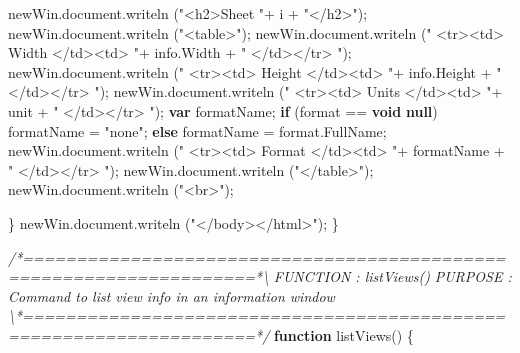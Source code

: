 \documentclass[]{article}
\newenvironment{Shaded}{}{}
\newcommand{\KeywordTok}[1]{\textcolor[rgb]{0.00,0.44,0.13}{\textbf{{#1}}}}
\newcommand{\StringTok}[1]{\textcolor[rgb]{0.25,0.44,0.63}{{#1}}}
\newcommand{\CommentTok}[1]{\textcolor[rgb]{0.38,0.63,0.69}{\textit{{#1}}}}
\newcommand{\OtherTok}[1]{\textcolor[rgb]{0.00,0.44,0.13}{{#1}}}
\newcommand{\FunctionTok}[1]{\textcolor[rgb]{0.02,0.16,0.49}{{#1}}}
\newcommand{\NormalTok}[1]{{#1}}
\begin{document}
\begin{Shaded}
\begin{Highlighting}[]
      \OtherTok{newWin}\NormalTok{.}\OtherTok{document}\NormalTok{.}\FunctionTok{writeln} \NormalTok{(}\StringTok{"<h2>Sheet "}\NormalTok{+ i + }\StringTok{"</h2>"}\NormalTok{);}
      \OtherTok{newWin}\NormalTok{.}\OtherTok{document}\NormalTok{.}\FunctionTok{writeln} \NormalTok{(}\StringTok{"<table>"}\NormalTok{);}
      \OtherTok{newWin}\NormalTok{.}\OtherTok{document}\NormalTok{.}\FunctionTok{writeln} \NormalTok{(}\StringTok{" <tr><td> Width </td><td> "}\NormalTok{+ }
                   \OtherTok{info}\NormalTok{.}\FunctionTok{Width} \NormalTok{+ }\StringTok{" </td></tr> "}\NormalTok{);}
      \OtherTok{newWin}\NormalTok{.}\OtherTok{document}\NormalTok{.}\FunctionTok{writeln} \NormalTok{(}\StringTok{"  <tr><td> Height </td><td> "}\NormalTok{+ }
                   \OtherTok{info}\NormalTok{.}\FunctionTok{Height} \NormalTok{+ }\StringTok{" </td></tr> "}\NormalTok{);}
      \OtherTok{newWin}\NormalTok{.}\OtherTok{document}\NormalTok{.}\FunctionTok{writeln} \NormalTok{(}\StringTok{" <tr><td> Units </td><td> "}\NormalTok{+ }
                   \NormalTok{unit + }\StringTok{" </td></tr> "}\NormalTok{);}
      \KeywordTok{var} \NormalTok{formatName;}
      \KeywordTok{if} \NormalTok{(format == }\KeywordTok{void} \KeywordTok{null}\NormalTok{)}
    \NormalTok{formatName = }\StringTok{"none"}\NormalTok{;}
      \KeywordTok{else}
    \NormalTok{formatName = }\OtherTok{format}\NormalTok{.}\FunctionTok{FullName}\NormalTok{;}
      \OtherTok{newWin}\NormalTok{.}\OtherTok{document}\NormalTok{.}\FunctionTok{writeln} \NormalTok{(}\StringTok{" <tr><td> Format </td><td> "}\NormalTok{+ }
                   \NormalTok{formatName + }\StringTok{" </td></tr> "}\NormalTok{);}
      \OtherTok{newWin}\NormalTok{.}\OtherTok{document}\NormalTok{.}\FunctionTok{writeln} \NormalTok{(}\StringTok{"</table>"}\NormalTok{);}
      \OtherTok{newWin}\NormalTok{.}\OtherTok{document}\NormalTok{.}\FunctionTok{writeln} \NormalTok{(}\StringTok{"<br>"}\NormalTok{);}
      
    \NormalTok{\}}
  \OtherTok{newWin}\NormalTok{.}\OtherTok{document}\NormalTok{.}\FunctionTok{writeln} \NormalTok{(}\StringTok{"</body></html>"}\NormalTok{);}
\NormalTok{\} }

\CommentTok{/*====================================================================*\textbackslash{} }
\CommentTok{FUNCTION : listViews()}
\CommentTok{PURPOSE  : Command to list view info in an information window }
\CommentTok{\textbackslash{}*====================================================================*/}
\KeywordTok{function} \FunctionTok{listViews}\NormalTok{() }
\NormalTok{\{}
  

\end{Highlighting}
\end{Shaded}
\end{document}
